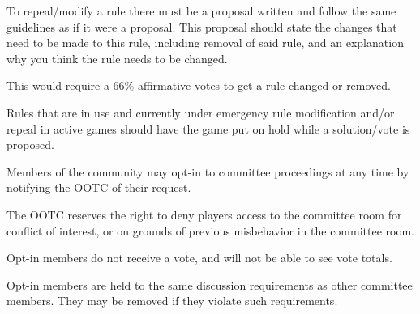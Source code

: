 \begin{deepEnumerate}
    \item To repeal/modify a rule there must be a proposal written and follow the same guidelines as if it were a proposal. 
    This proposal should state the changes that need to be made to this rule, including removal of said rule, and an explanation why you think the rule needs to be changed.
    \begin{deepEnumerate}
        \item This would require a 66\% affirmative votes to get a rule changed or removed.
        \item Rules that are in use and currently under emergency rule modification and/or repeal in active games should have the game put on hold 
        while a solution/vote is proposed.
    \end{deepEnumerate}
\end{deepEnumerate}

\begin{deepEnumerate}
    \item Members of the community may opt-in to committee proceedings at any time by notifying the OOTC of their request.
    \begin{deepEnumerate}
        \item The OOTC reserves the right to deny players access to the committee room for conflict of interest, or on grounds of previous misbehavior in the committee room.
        \item Opt-in members do not receive a vote, and will not be able to see vote totals.
        \item Opt-in members are held to the same discussion requirements as other committee members. They may be removed if they violate such requirements.
    \end{deepEnumerate}
\end{deepEnumerate}